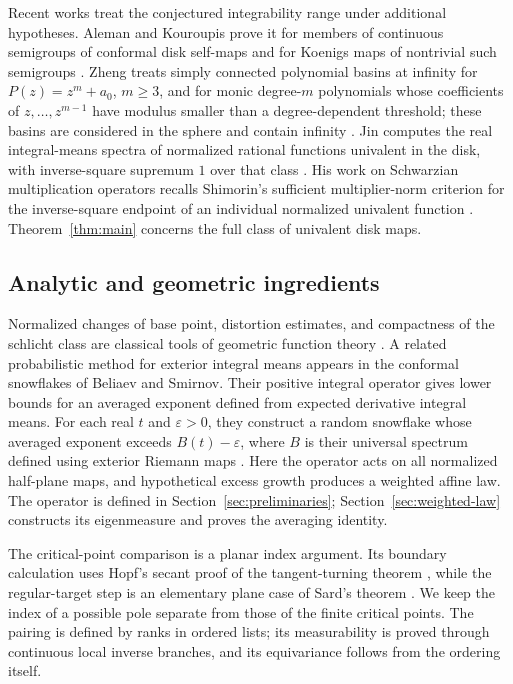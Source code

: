 Recent works treat the conjectured integrability range under additional
hypotheses. Aleman and Kouroupis prove it for members of continuous
semigroups of conformal disk self-maps and for Koenigs maps of nontrivial
such semigroups
\cite[Theorem~1.1 and Proposition~2.2]{AlemanKouroupis2025}.
Zheng treats simply connected polynomial basins at infinity for
$P(z)=z^m+a_0$, $m\ge3$, and for monic degree-$m$ polynomials whose
coefficients of $z,\ldots,z^{m-1}$ have modulus smaller than a
degree-dependent threshold; these basins
are considered in the sphere and contain infinity
\cite[Theorems~1.3--1.4]{Zheng2026Basins}.
Jin computes the real integral-means spectra of normalized rational
functions univalent in the disk,
with inverse-square supremum $1$ over that class
\cite[Theorem~6.20 and Corollaries~6.22--6.23]{Jin2025IntegralMeans}.
His work on Schwarzian multiplication operators recalls Shimorin's
sufficient multiplier-norm criterion for the inverse-square endpoint
of an individual normalized univalent function
\cite[Proposition~1.4(2)]{Jin2026Multipliers}.
Theorem~\ref{thm:main} concerns the full class of univalent disk maps.

\subsection{Analytic and geometric ingredients}

Normalized changes of base point, distortion estimates, and compactness
of the schlicht class are classical tools of geometric function theory
\cite[Chapters~1--2]{Duren1983}. A related probabilistic method for
exterior integral means appears in the conformal snowflakes of Beliaev
and Smirnov. Their positive integral operator gives lower bounds for an
averaged exponent defined from expected derivative integral means.
For each real $t$ and $\varepsilon>0$, they construct a random snowflake
whose averaged exponent exceeds $B(t)-\varepsilon$, where $B$ is their
universal spectrum defined using exterior Riemann maps
\cite[Lemma~3.4 and Theorem~4.1]{BeliaevSmirnov2010}.
Here the operator acts on all normalized half-plane maps, and
hypothetical excess growth produces a weighted affine law. The
operator is defined in Section~\ref{sec:preliminaries};
Section~\ref{sec:weighted-law} constructs its eigenmeasure and proves
the averaging identity.

The critical-point comparison is a planar index argument. Its
boundary calculation uses Hopf's secant proof of the tangent-turning
theorem \cite[\S2, pp.~53--55]{Hopf1935}, while the regular-target
step is an elementary plane case of Sard's theorem
\cite[Theorem~4.1]{Sard1942}.
We keep the index of a possible pole separate from those of the finite
critical points. The pairing is defined by ranks in ordered lists;
its measurability is proved through continuous local inverse branches,
and its equivariance follows from the ordering itself.

